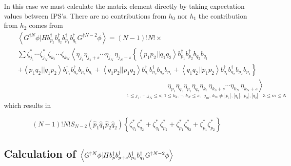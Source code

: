 In this case we must calculate the matrix element directly by taking
expectation values between IPS's. There are no contributions from $h_{0}$
nor $h_{1}$ the contribution from $h_{2}$ comes from 
\begin{eqnarray}
&&\left\langle G^{\dagger N}\phi |Hb_{p_{2}}^{\dagger }b_{q_{2}}^{\dagger
}b_{p_{1}}^{\dagger }b_{q_{1}}^{\dagger }G^{\dagger N-2}\phi \right\rangle
=\left( N-1\right) !N!\times  \nonumber \\
&&\sum \zeta _{j_{1}}^{\ast }\cdots \zeta _{j_{N}}^{\ast }\zeta
_{k_{3}}\cdots \zeta _{k_{N}}\left\langle \eta _{j_{1}}\eta _{j_{1}+s}\cdots
\eta _{j_{N}\,}\eta _{j_{N}+s}\right. \left\{ \left\langle
p_{1}p_{2}||q_{1}q_{2}\right\rangle b_{p_{1}}^{\dagger }b_{p_{2}}^{\dagger
}b_{q_{2}}b_{q_{1}}\right.  \nonumber \\
&&\left. +\left\langle p_{1}q_{2}||q_{1}p_{2}\right\rangle
b_{p_{1}}^{\dagger }b_{q_{2}}^{\dagger }b_{p_{2}}b_{q_{1}}+\left\langle
q_{1}p_{2}||p_{1}q_{2}\right\rangle b_{q_{1}}^{\dagger }b_{p_{2}}^{\dagger
}b_{q_{2}}b_{p_{1}}+\left\langle q_{1}q_{2}||p_{1}p_{2}\right\rangle
b_{q_{1}}^{\dagger }b_{q_{2}}^{\dagger }b_{p_{2}}b_{p_{1}}\right\}  \nonumber
\\
&&\qquad \qquad \qquad \qquad \qquad \qquad \qquad \qquad \qquad \qquad
\qquad \left. \eta _{p_{1}}\eta _{q_{1}}\eta _{p_{2}}\eta _{q_{2}}\eta
_{k_{3}\,}\eta _{k_{3}+s}\cdots \eta _{k_{N}\,}\eta _{k_{N}+s}\right\rangle 
\nonumber \\
&&\qquad \qquad \qquad \qquad \qquad \qquad \qquad \qquad _{1\leq
j_{1},\cdots ,j_{N}\leq s;\,1\leq k_{3},\cdots ,k_{N}\leq
s;\,\,\,j_{m},\,k_{m}\neq \left| p_{1}\right| ,\left| q_{1}\right| ,\left|
p_{2}\right| ,\left| q_{2}\right| \quad 3\leq m\leq N}
\end{eqnarray}%
which results in

\begin{equation}
\left( N-1\right) !N!S_{N-2}\left( \hat{p}_{1}\hat{q}_{1}\hat{p}_{2}\hat{q}%
_{2}\right) \left\{ \zeta _{q_{1}}^{\ast }\zeta _{q_{2}}^{\ast }+\zeta
_{q_{1}}^{\ast }\zeta _{p_{2}}^{\ast }+\zeta _{p_{1}}^{\ast }\zeta
_{q_{2}}^{\ast }+\zeta _{p_{1}}^{\ast }\zeta _{p_{2}}^{\ast }\right\}
\end{equation}

\subsection{Calculation of $\left\langle G^{\dagger N}\protect\phi %
|Hb_{p}^{\dagger }b_{p+s}^{\dagger }b_{p_{1}}^{\dagger }b_{q_{1}}^{\dagger
}G^{\dagger N-2}\protect\phi \right\rangle $}


